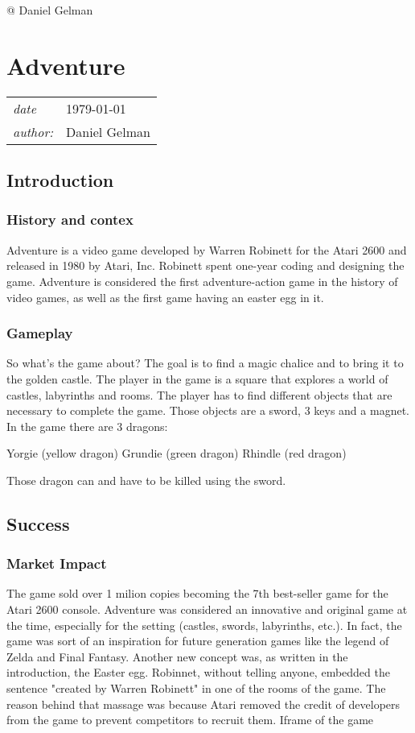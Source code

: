 \documentclass[a4paper,10pt]{book}
\newcommand{\pageHeader}[4]{
    \section{#1}
    \vspace{-0.3cm}
    \begin{table}[h!]
     \begin{tabular}{ll}
        \hline
        \textit{date} & #2 \\
        \textit{author: } & #3\\
        \hline
     \end{tabular}
    \end{table}
    \vspace{-0.3cm}
}
\begin{document}
 
 
 
 @ Daniel Gelman 
 
 
 \newpage\pageHeader{Adventure}{1979-01-01}{Daniel Gelman}{Adventure is an arcade game created in 1979. Did you know that this is game is the inspiration behind the legend of Zelda? Me neither. But I will tell you more!}
 \subsection{Introduction }
 \subsubsection{History and contex }
   \textbf{}   \textit{}
 
                Adventure is a video game developed by Warren Robinett for the Atari 2600 and released in 1980 by Atari, Inc. Robinett spent one-year coding and designing the game. Adventure is considered the first adventure-action game in the history of video games,
                as well as the first game having an easter egg in it.

             
 \subsubsection{Gameplay }
   \textbf{}   \textit{}
 
                So what's the game about?   The goal is to find a magic chalice and to bring it to the golden castle. The player in the game is a square that explores a world of castles, labyrinths and rooms. The player has to find different objects
                that are necessary to complete the game. Those objects are a sword, 3 keys and a magnet. In the game there are 3 dragons:
                 
 Yorgie (yellow dragon) 
 Grundie (green dragon) 
 Rhindle (red dragon) 
 
                Those dragon can and have to be killed using the sword.
             
 
 \subsection{Success }
 \subsubsection{Market Impact }
            The game sold over 1 milion copies becoming the 7th best-seller game for the Atari 2600 console. Adventure was considered an innovative and original game at the time, especially for the setting (castles, swords, labyrinths, etc.). In fact, the game was
            sort of an inspiration for future generation games like the legend of Zelda and Final Fantasy. Another new concept was, as written in the introduction, the Easter egg. Robinnet, without telling anyone, embedded the sentence "created by Warren
            Robinett" in one of the rooms of the game. The reason behind that massage was because Atari removed the credit of developers from the game to prevent competitors to recruit them.
               \textbf{}   \textit{}
  Iframe of the game  
 
\end{document}
